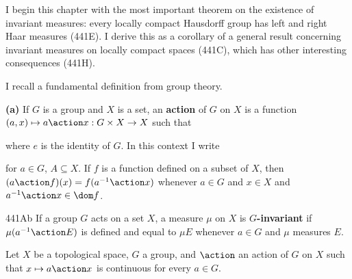 
\def\high#1{\lceil#1\rceil}
\def\rti{right-{\vthsp}translation-{\vthsp}invariant}
\def\tr{\mathop{\text{tr}}\nolimits}
\def\trs{^{\top}}

\def\chaptername{Topological groups}
\def\sectionname{Invariant measures on locally compact spaces}


I begin this chapter with the most important theorem on
the existence of invariant measures:  every locally compact Hausdorff
group has left and right Haar measures (441E).   I derive this as a
corollary of a general result concerning invariant measures on locally
compact spaces (441C), which has other interesting consequences (441H).

 I recall a fundamental definition from
group theory.

\medskip

{\bf (a)} If $G$ is a group and $X$ is a set, an {\bf action} of $G$ on
$X$ is a function $(a,x)\mapsto a\action x:G\times X\to X$ such that



\noindent where $e$ is the identity of $G$.   In this
context I write


\noindent for $a\in G$, $A\subseteq X$.   If $f$ is a function defined on a
subset of $X$, then $(a\action f)(x)=f(a^{-1}\action x)$ whenever
$a\in G$ and $x\in X$ and $a^{-1}\action x\in\dom f$.

\spheader 441Ab If a group $G$ acts on a set $X$, a measure $\mu$ on $X$
is {\bf $G$-invariant} if $\mu(a^{-1}\action E)$ is defined and equal to
$\mu E$ whenever $a\in G$ and $\mu$ measures $E$.


 Let $X$ be a topological space, $G$ a group, and
$\action$ an action of $G$ on $X$ such that $x\mapsto a\action x$ is
continuous for every $a\in G$.

